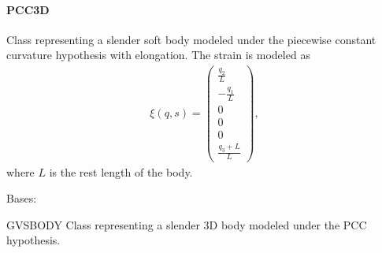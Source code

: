 \documentclass[letterpaper,10pt,english]{sphinxmanual}
\begin{document}
\sphinxstepscope


\paragraph{PCC3D}
\label{\detokenize{PCC/pcc3d:pcc3d}}\label{\detokenize{PCC/pcc3d::doc}}\label{\detokenize{PCC/pcc3d:module-classes}}
\sphinxAtStartPar
Class representing a slender soft body modeled under the piecewise constant curvature hypothesis with elongation.
The strain is modeled as
\begin{equation*}
\begin{split}\xi(q, s) = \left(\begin{array}{c} \displaystyle \frac{q_{2}}{L} \\ \displaystyle -\frac{q_{1}}{L} \\ 0 \\ 0 \\ 0 \\ \displaystyle \frac{q_{3} + L}{L}  \end{array}\right),\end{split}
\end{equation*}
\sphinxAtStartPar
where \(L\) is the rest length of the body.

\begin{fulllineitems}
\label{\detokenize{PCC/pcc3d:PCC3D}}
\pysigstartsignatures
{}
\pysigstopsignatures
\sphinxAtStartPar
Bases: {\hyperref[\detokenize{gvsbody:GVSBody}]{}}

\sphinxAtStartPar
GVSBODY Class representing a slender 3D body modeled under the PCC
hypothesis.

\end{fulllineitems}


\sphinxstepscope
\end{document}

